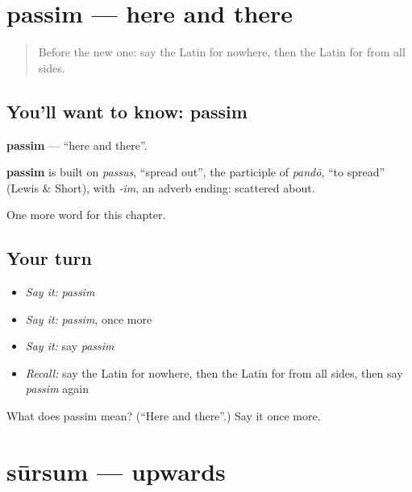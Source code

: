 \section[passim]{passim — here and there}

\label{lesson:LA-C264-passim}



\begin{quote}
Before the new one: say the Latin for nowhere, then the Latin for from all sides.
\end{quote}

\subsection*{You'll want to know: passim}
\textbf{passim} — \textquotedblleft{}here and there\textquotedblright{}.

\begin{cousinweb}
\textbf{passim} is built on \emph{passus}, \textquotedblleft{}spread out\textquotedblright{}, the participle of \emph{pandō}, \textquotedblleft{}to spread\textquotedblright{} (Lewis \& Short), with \emph{-im}, an adverb ending: scattered about.
\end{cousinweb}

\begin{grammarlens}[title={What you've built}]
One more word for this chapter.
\end{grammarlens}

\subsection*{Your turn}
\begin{itemize}
\raggedright
  \item \emph{Say it:} \emph{passim}
  \item \emph{Say it:} \emph{passim}, once more
  \item \emph{Say it:} say \emph{passim}
  \item \emph{Recall:} say the Latin for nowhere, then the Latin for from all sides, then say \emph{passim} again
\end{itemize}

\begin{tcolorbox}[breakable,colback=teal!4,colframe=teal!35!black,title={Before you move on}]
What does passim mean? (\textquotedblleft{}Here and there\textquotedblright{}.) Say it once more.
\end{tcolorbox}
\section[sūrsum]{sūrsum — upwards}

